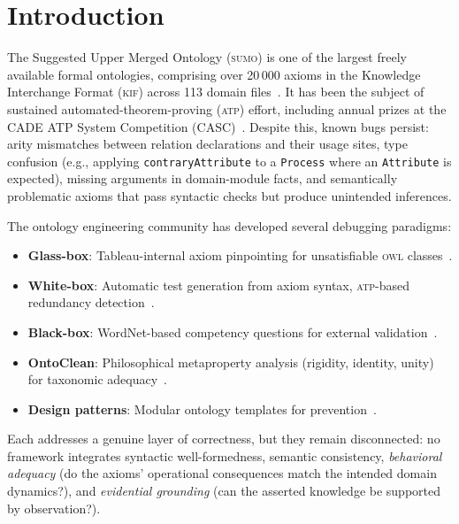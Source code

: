 \documentclass[11pt]{article}
\newcommand{\KIF}{\textsc{kif}}
\newcommand{\SUMO}{\textsc{sumo}}
\newcommand{\OWL}{\textsc{owl}}
\newcommand{\ATP}{\textsc{atp}}
\theoremstyle{definition}
\theoremstyle{plain}
\begin{document}
\section{Introduction}
\label{sec:intro}

The Suggested Upper Merged Ontology (\SUMO{}) is one of the largest freely available
formal ontologies, comprising over 20\,000 axioms in the Knowledge Interchange
Format (\KIF{}) across 113 domain files~\cite{pease2002sumo}.
It has been the subject of sustained automated-theorem-proving (\ATP{}) effort,
including annual prizes at the CADE ATP System Competition
(CASC)~\cite{pease-casc-prizes,pease-sutcliffe-2007}.
Despite this, known bugs persist: arity mismatches between relation declarations
and their usage sites, type confusion (e.g., applying \texttt{contraryAttribute}
to a \texttt{Process} where an \texttt{Attribute} is expected), missing arguments
in domain-module facts, and semantically problematic axioms that pass syntactic
checks but produce unintended inferences.

The ontology engineering community has developed several debugging paradigms:
\begin{itemize}[nosep]
  \item \textbf{Glass-box}: Tableau-internal axiom pinpointing for unsatisfiable
    \OWL{} classes~\cite{kalyanpur2005}.
  \item \textbf{White-box}: Automatic test generation from axiom syntax, \ATP{}-based
    redundancy detection~\cite{keet2017whitebox}.
  \item \textbf{Black-box}: WordNet-based competency questions for external
    validation~\cite{keet2017blackbox}.
  \item \textbf{OntoClean}: Philosophical metaproperty analysis (rigidity, identity,
    unity) for taxonomic adequacy~\cite{guarino-welty-ontoclean}.
  \item \textbf{Design patterns}: Modular ontology templates for
    prevention~\cite{gangemi-presutti-patterns}.
\end{itemize}
Each addresses a genuine layer of correctness, but they remain disconnected:
no framework integrates syntactic well-formedness, semantic consistency,
\emph{behavioral adequacy} (do the axioms' operational consequences match
the intended domain dynamics?), and \emph{evidential grounding} (can the
asserted knowledge be supported by observation?).
\end{document}
